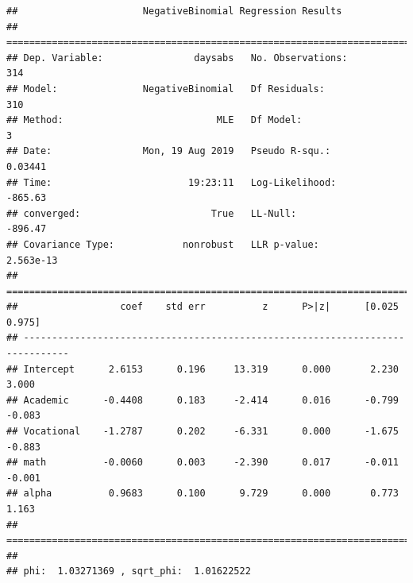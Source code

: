 \documentclass[polish,]{book}
\begin{document}
\begin{verbatim}
##                      NegativeBinomial Regression Results                      
## ==============================================================================
## Dep. Variable:                daysabs   No. Observations:                  314
## Model:               NegativeBinomial   Df Residuals:                      310
## Method:                           MLE   Df Model:                            3
## Date:                Mon, 19 Aug 2019   Pseudo R-squ.:                 0.03441
## Time:                        19:23:11   Log-Likelihood:                -865.63
## converged:                       True   LL-Null:                       -896.47
## Covariance Type:            nonrobust   LLR p-value:                 2.563e-13
## ==============================================================================
##                  coef    std err          z      P>|z|      [0.025      0.975]
## ------------------------------------------------------------------------------
## Intercept      2.6153      0.196     13.319      0.000       2.230       3.000
## Academic      -0.4408      0.183     -2.414      0.016      -0.799      -0.083
## Vocational    -1.2787      0.202     -6.331      0.000      -1.675      -0.883
## math          -0.0060      0.003     -2.390      0.017      -0.011      -0.001
## alpha          0.9683      0.100      9.729      0.000       0.773       1.163
## ==============================================================================
## 
## phi:  1.03271369 , sqrt_phi:  1.01622522
\end{verbatim}
\end{document}
